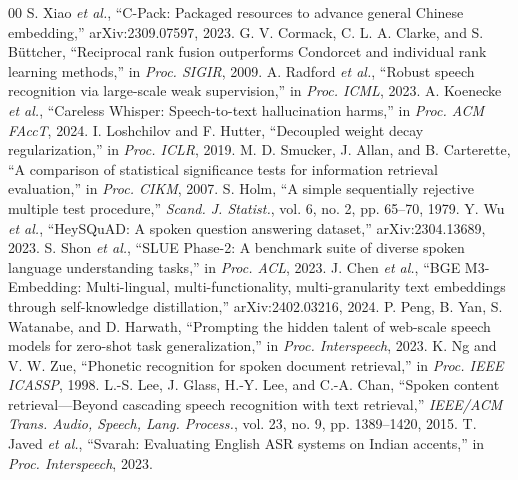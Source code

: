 \documentclass[conference]{IEEEtran}
\begin{document}
\begin{thebibliography}{00}
 S. Xiao \textit{et al.}, ``C-Pack: Packaged resources to advance general Chinese embedding,'' arXiv:2309.07597, 2023.
 G. V. Cormack, C. L. A. Clarke, and S. B\"{u}ttcher, ``Reciprocal rank fusion outperforms Condorcet and individual rank learning methods,'' in \textit{Proc. SIGIR}, 2009.
 A. Radford \textit{et al.}, ``Robust speech recognition via large-scale weak supervision,'' in \textit{Proc. ICML}, 2023.
 A. Koenecke \textit{et al.}, ``Careless Whisper: Speech-to-text hallucination harms,'' in \textit{Proc. ACM FAccT}, 2024.
 I. Loshchilov and F. Hutter, ``Decoupled weight decay regularization,'' in \textit{Proc. ICLR}, 2019.
 M. D. Smucker, J. Allan, and B. Carterette, ``A comparison of statistical significance tests for information retrieval evaluation,'' in \textit{Proc. CIKM}, 2007.
 S. Holm, ``A simple sequentially rejective multiple test procedure,'' \textit{Scand. J. Statist.}, vol. 6, no. 2, pp. 65--70, 1979.
 Y. Wu \textit{et al.}, ``HeySQuAD: A spoken question answering dataset,'' arXiv:2304.13689, 2023.
 S. Shon \textit{et al.}, ``SLUE Phase-2: A benchmark suite of diverse spoken language understanding tasks,'' in \textit{Proc. ACL}, 2023.
 J. Chen \textit{et al.}, ``BGE M3-Embedding: Multi-lingual, multi-functionality, multi-granularity text embeddings through self-knowledge distillation,'' arXiv:2402.03216, 2024.
 P. Peng, B. Yan, S. Watanabe, and D. Harwath, ``Prompting the hidden talent of web-scale speech models for zero-shot task generalization,'' in \textit{Proc. Interspeech}, 2023.
 K. Ng and V. W. Zue, ``Phonetic recognition for spoken document retrieval,'' in \textit{Proc. IEEE ICASSP}, 1998.
 L.-S. Lee, J. Glass, H.-Y. Lee, and C.-A. Chan, ``Spoken content retrieval---Beyond cascading speech recognition with text retrieval,'' \textit{IEEE/ACM Trans. Audio, Speech, Lang. Process.}, vol. 23, no. 9, pp. 1389--1420, 2015.
 T. Javed \textit{et al.}, ``Svarah: Evaluating English ASR systems on Indian accents,'' in \textit{Proc. Interspeech}, 2023.
\end{thebibliography}
\end{document}
